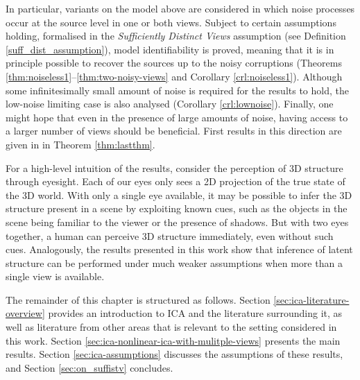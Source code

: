 In particular, variants on the model above are considered in which noise processes occur at the source level in one or both views. 
Subject to certain assumptions holding, formalised in the \emph{Sufficiently Distinct Views} assumption (see Definition \ref{suff_dist_assumption}), model identifiability is proved, meaning that it is in principle possible to recover the sources up to the noisy corruptions (Theorems \ref{thm:noiseless1}--\ref{thm:two-noisy-views} and Corollary \ref{crl:noiseless1}).
Although some infinitesimally small amount of noise is required for the results to hold, the low-noise limiting case is also analysed (Corollary \ref{crl:lownoise}). 
Finally, one might hope that even in the presence of large amounts of noise, having access to a larger number of views should be beneficial. 
First results in this direction are given in in Theorem \ref{thm:lastthm}.


For a high-level intuition of the results, consider the perception of 3D structure through eyesight.
Each of our eyes only sees a 2D projection of the true state of the 3D world.
With only a single eye available, it may be possible to infer the 3D structure present in a scene by exploiting known cues, such as the objects in the scene being familiar to the viewer or the presence of shadows.
But with two eyes together, a human can perceive 3D structure immediately, even without such cues. 
Analogously, the results presented in this work show that inference of latent structure can be performed under much weaker assumptions when more than a single view is available.

The remainder of this chapter is structured as follows.
Section \ref{sec:ica-literature-overview} provides an introduction to ICA and the literature surrounding it, as well as literature from other areas that is relevant to the setting considered in this work.
Section \ref{sec:ica-nonlinear-ica-with-mulitple-views} presents the main results.
Section \ref{sec:ica-assumptions} discusses the assumptions of these results, and Section \ref{sec:on_suffistv} concludes.



